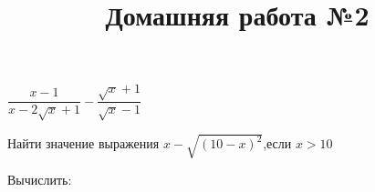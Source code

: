 \begin{listofex}
\begin{enumcols}[itemcolumns=3]
		\item \( \dfrac{x-1}{x-2\sqrt{x}+1}-\dfrac{\sqrt{x}+1}{\sqrt{x}-1} \) 
	\end{enumcols}
	\item Найти значение выражения \( x-\sqrt{(10-x)^2} \),\quad если \( x>10 \) 
	\item Вычислить:
	\begin{enumcols}[itemcolumns=2]
		\item {}
		\item {}
	\end{enumcols}
\end{listofex}
\newpage
\title{Домашняя работа №2}

